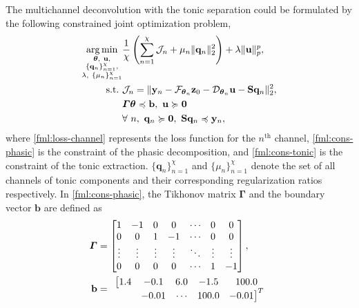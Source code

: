 \documentclass[10pt,conference]{ieeeconf}
\DeclareMathOperator*{\argmin}{arg\,min}
\begin{document}
The multichannel deconvolution with the tonic separation could be formulated by the following constrained joint optimization problem,
\begin{subequations} \label{fml:the:optimization}
  \renewcommand{\theequation}
  {\theparentequation-\arabic{equation}}
  \begin{align}
  \argmin\limits_{\substack{\boldsymbol{\theta},~\mathbf{u}, \\ \{\mathbf{q}_n\}_{n=1}^{\chi}, \\ \lambda,~\{\mu_n\}_{n=1}^{\chi}}} & \frac{1}{\chi} \left( \sum_{n=1}^{\chi} \mathcal{J}_n + \mu_n \lVert \mathbf{q}_n \rVert_2^2 \right) + \lambda \lVert \mathbf{u} \rVert^p_p, \\
  \mathrm{s.t.}~&\mathcal{J}_n = \lVert \mathbf{y}_n - \mathcal{F}_{\boldsymbol{\theta}_n} \mathbf{z}_{0} - \mathcal{D}_{\boldsymbol{\theta}_n} \mathbf{u} - \mathbf{S} \mathbf{q}_n \rVert^2_2, \label{fml:loss-channel}\\
  & \boldsymbol{\Gamma} \boldsymbol{\theta} \preccurlyeq \mathbf{b},~ \mathbf{u} \succcurlyeq \mathbf{0} \label{fml:cons-phasic}\\
  & \forall~n,~\mathbf{q}_n \succcurlyeq \mathbf{0},~\mathbf{S}\mathbf{q}_n \preccurlyeq \mathbf{y}_n, \label{fml:cons-tonic}
  \end{align}
\end{subequations}
where \eqref{fml:loss-channel} represents the loss function for the $n^{\mathrm{th}}$ channel, \eqref{fml:cons-phasic} is the constraint of the phasic decomposition, and \eqref{fml:cons-tonic} is the constraint of the tonic extraction. $\{\mathbf{q}_n\}_{n=1}^{\chi}$ and $\{\mu_n\}_{n=1}^{\chi}$ denote the set of all channels of tonic components and their corresponding regularization ratios respectively. In \eqref{fml:cons-phasic}, the Tikhonov matrix $\boldsymbol{\Gamma}$ and the boundary vector $\mathbf{b}$ are defined as
\begin{subequations} \label{fml:the:constraint}
  \renewcommand{\theequation}
  {\theparentequation-\arabic{equation}}
  \begin{align}
  \boldsymbol{\Gamma} &= \begin{bmatrix}
  1 & -1 & 0 & 0 & \cdots & 0 & 0 \\
  0 & 0 & 1 & -1 & \cdots & 0 & 0 \\
  \vdots & \vdots & \vdots & \vdots & \ddots & \vdots & \vdots \\
  0 & 0 & 0 & 0 & \cdots & 1 & -1
  \end{bmatrix}, \\
  \mathbf{b} &= 
    \begin{array}{ccccc}
      \big[1.4 & -0.1 & 6.0 & -1.5 & 100.0 \\
      & -0.01 & \cdots & 100.0 & -0.01 \big]^T
    \end{array}  
  \end{align}
\end{subequations}
\end{document}
